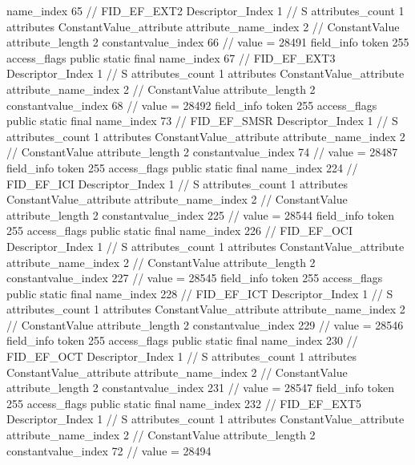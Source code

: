 {{{{{				name_index	65		// FID_EF_EXT2
				Descriptor_Index	1		// S
				attributes_count	1
				attributes {
				ConstantValue_attribute {
					attribute_name_index	2		// ConstantValue
					attribute_length	2
					constantvalue_index	66		// value = 28491
				}
				}
			}
			field_info {
				token	255
				access_flags	public static final
				name_index	67		// FID_EF_EXT3
				Descriptor_Index	1		// S
				attributes_count	1
				attributes {
				ConstantValue_attribute {
					attribute_name_index	2		// ConstantValue
					attribute_length	2
					constantvalue_index	68		// value = 28492
				}
				}
			}
			field_info {
				token	255
				access_flags	public static final
				name_index	73		// FID_EF_SMSR
				Descriptor_Index	1		// S
				attributes_count	1
				attributes {
				ConstantValue_attribute {
					attribute_name_index	2		// ConstantValue
					attribute_length	2
					constantvalue_index	74		// value = 28487
				}
				}
			}
			field_info {
				token	255
				access_flags	public static final
				name_index	224		// FID_EF_ICI
				Descriptor_Index	1		// S
				attributes_count	1
				attributes {
				ConstantValue_attribute {
					attribute_name_index	2		// ConstantValue
					attribute_length	2
					constantvalue_index	225		// value = 28544
				}
				}
			}
			field_info {
				token	255
				access_flags	public static final
				name_index	226		// FID_EF_OCI
				Descriptor_Index	1		// S
				attributes_count	1
				attributes {
				ConstantValue_attribute {
					attribute_name_index	2		// ConstantValue
					attribute_length	2
					constantvalue_index	227		// value = 28545
				}
				}
			}
			field_info {
				token	255
				access_flags	public static final
				name_index	228		// FID_EF_ICT
				Descriptor_Index	1		// S
				attributes_count	1
				attributes {
				ConstantValue_attribute {
					attribute_name_index	2		// ConstantValue
					attribute_length	2
					constantvalue_index	229		// value = 28546
				}
				}
			}
			field_info {
				token	255
				access_flags	public static final
				name_index	230		// FID_EF_OCT
				Descriptor_Index	1		// S
				attributes_count	1
				attributes {
				ConstantValue_attribute {
					attribute_name_index	2		// ConstantValue
					attribute_length	2
					constantvalue_index	231		// value = 28547
				}
				}
			}
			field_info {
				token	255
				access_flags	public static final
				name_index	232		// FID_EF_EXT5
				Descriptor_Index	1		// S
				attributes_count	1
				attributes {
				ConstantValue_attribute {
					attribute_name_index	2		// ConstantValue
					attribute_length	2
					constantvalue_index	72		// value = 28494
				}
				}
			}
}}}}
